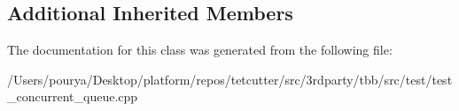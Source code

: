 \subsection*{Additional Inherited Members}


The documentation for this class was generated from the following file\+:\begin{DoxyCompactItemize}
\item 
/\+Users/pourya/\+Desktop/platform/repos/tetcutter/src/3rdparty/tbb/src/test/test\+\_\+concurrent\+\_\+queue.\+cpp\end{DoxyCompactItemize}
